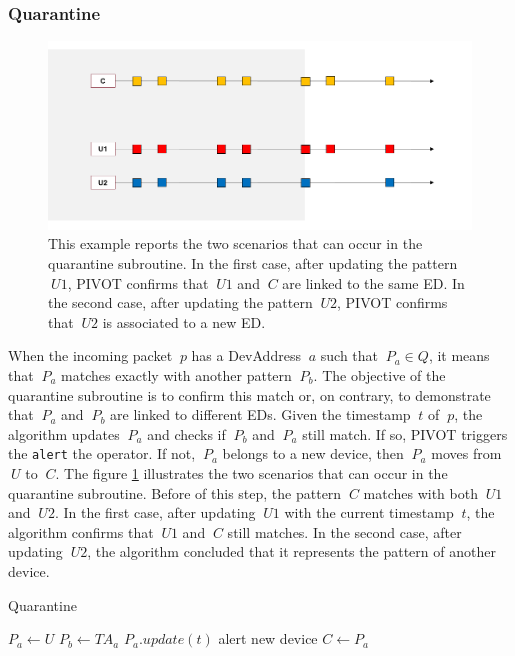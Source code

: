 \vspace{5mm}
\subsubsection{Quarantine}
\begin{figure}[t]
    \centering
    \includegraphics[width=0.7\linewidth]{images/pivot/quarantine.PNG}
    \caption{This example reports the two scenarios that can occur in the quarantine subroutine. In the first case, after updating the pattern \(\ U1 \), PIVOT confirms that \(\ U1 \) and \(\ C \) are linked to the same ED. In the second case, after updating the pattern \(\ U2 \), PIVOT confirms that \(\ U2 \) is associated to a new ED.}
    \label{fig:quarantine}
\end{figure}
When the incoming packet \(\ p \) has a DevAddress \(\ a \) such that \(\ P_{a} \in Q \), it means that \(\ P_{a} \) matches exactly with another pattern \(\ P_{b} \). The objective of the quarantine subroutine is to confirm this match or, on contrary, to demonstrate that \(\ P_{a} \) and \(\ P_{b} \) are linked to different EDs. Given the timestamp \(\ t \) of \(\ p \), the algorithm updates \(\ P_{a} \) and checks if \(\ P_{b} \) and \(\ P_{a} \) still match. If so, PIVOT triggers the \texttt{alert} the operator. If not, \(\ P_{a} \) belongs to a new device, then \(\ P_{a} \) moves from \(\ U \) to \(\ C \). The figure \ref{fig:quarantine} illustrates the two scenarios that can occur in the quarantine subroutine. Before of this step, the pattern \(\ C \) matches with both \(\ U1 \) and \(\ U2 \). In the first case, after updating \(\ U1 \) with the current timestamp \(\ t \), the algorithm confirms that \(\ U1 \) and \(\ C \) still matches. In the second case, after updating \(\ U2 \), the algorithm concluded that it represents the pattern of another device.

\vspace{3mm}
\begin{algorithm}[h!]
    \caption{Quarantine}
    \begin{algorithmic}[1]
        \State $P_{a} \gets U$
        \State $P_{b} \gets TA_{a}$
        \State $P_{a}.update(t)$
            \State alert
        \Else
            \State new device
            \State $C \gets P_{a}$
        \EndIf
    \end{algorithmic}
\end{algorithm}
\vspace{5mm}

\newpage